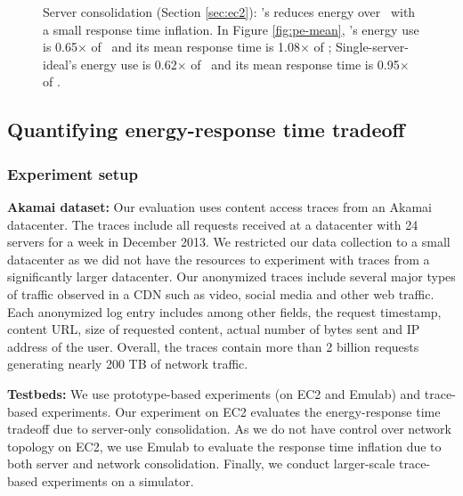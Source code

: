 \begin{figure}
        \caption{Server consolidation (Section \ref{sec:ec2}):  \shrink's reduces energy over \peakS\ with a small response time inflation. In Figure \ref{fig:pe-mean}, \shrink's energy use is 0.65$\times$ of \peakS\ and its mean response time is 1.08$\times$ of \peakS; Single-server-ideal's energy use is 0.62$\times$  of \peakS\ and its mean response time is 0.95$\times$ of \peakS.}
        \label{fig:pe}
\end{figure}

\subsection{Quantifying energy-response time tradeoff}
\label{sec:quantify}
\vspace{-0.1in}
\subsubsection{Experiment setup}
\label{sec:setup}
\textbf{Akamai dataset:} Our evaluation uses content access traces from an Akamai datacenter. The traces include all requests received at a datacenter with 24 servers for a week in December 2013. We restricted our data collection to a small datacenter as we did not have the resources to experiment with traces from a significantly larger datacenter. Our anonymized traces include several major types of traffic observed in a CDN such as video, social media and other web traffic. Each anonymized log entry includes among other fields, the request timestamp, content URL, size of requested content, actual number of bytes sent and IP address of the user. Overall, the traces contain more than 2 billion requests generating nearly 200 TB of network traffic.

\textbf{Testbeds:} We use prototype-based experiments (on EC2 and Emulab) and trace-based experiments. Our experiment on EC2 evaluates the energy-response time tradeoff due to server-only consolidation. As we do not have control over network topology on EC2, we use Emulab to evaluate the response time inflation due to both server and network consolidation. Finally, we conduct larger-scale trace-based experiments on a simulator.








